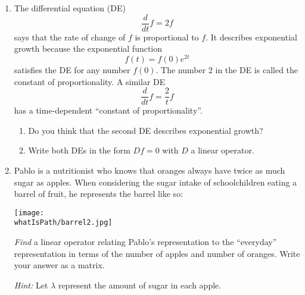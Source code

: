 \begin{enumerate}
\item The differential equation (DE) \[\frac{d}{dt} f=2f\] says that the rate of change of $f$ is proportional to $f$. It describes exponential growth because the exponential function 
\[f(t)=f(0)e^{2t}\] satisfies the DE for any number $f(0)$. The number 2 in the DE is called the constant of proportionality.  
A similar DE \[\frac{d}{dt}f=\frac{2}{t}f\] 
has a time-dependent ``constant of proportionality''.
\begin{enumerate}
\item Do you think that the second DE describes exponential growth? 
\item Write both DEs in the form $Df=0$ with $D$ a linear operator. 
\end{enumerate}

\item \label{Pablo} Pablo is a nutritionist who knows that oranges always have twice as much sugar as apples.  When considering the sugar intake of schoolchildren eating a barrel of fruit, he represents the barrel like so: 

\hspace{3mm}
\texttt{[image: \\whatIsPath/barrel2.jpg]}


\emph{Find} a linear operator relating Pablo's representation to the ``everyday'' representation in terms of the number of apples and number of oranges.  Write your answer as a matrix.

\emph{Hint:} Let $\lambda$ represent the amount of sugar in each apple.




\end{enumerate}
